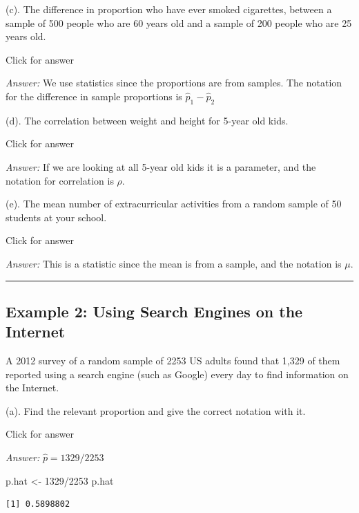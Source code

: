 \documentclass[
]{book}
\newenvironment{Shaded}{\begin{snugshade}}{\end{snugshade}}
\newcommand{\DecValTok}[1]{\textcolor[rgb]{0.00,0.00,0.81}{#1}}
\newcommand{\NormalTok}[1]{#1}
\newcommand{\OtherTok}[1]{\textcolor[rgb]{0.56,0.35,0.01}{#1}}
\newcommand{\SpecialCharTok}[1]{\textcolor[rgb]{0.00,0.00,0.00}{#1}}
\begin{document}
(c). The difference in proportion who have ever smoked cigarettes, between a sample of 500 people who are 60 years old and a sample of 200 people who are 25 years old.

Click for answer

\emph{Answer:} We use statistics since the proportions are from samples. The notation for the difference in sample proportions is \(\hat{p}_1 - \hat{p}_2\)

(d). The correlation between weight and height for 5-year old kids.

Click for answer

\emph{Answer:} If we are looking at all 5-year old kids it is a parameter, and the notation for correlation is \(\rho\).

(e). The mean number of extracurricular activities from a random sample of 50 students at your school.

Click for answer

\emph{Answer:} This is a statistic since the mean is from a sample, and the notation is \(\mu\).

\begin{center}\rule{0.5\linewidth}{0.5pt}\end{center}

\hypertarget{example-2-using-search-engines-on-the-internet}{%
\subsection{Example 2: Using Search Engines on the Internet}\label{example-2-using-search-engines-on-the-internet}}

A 2012 survey of a random sample of 2253 US adults found that 1,329 of them reported using a search engine (such as Google) every day to find information on the Internet.

(a). Find the relevant proportion and give the correct notation with it.

Click for answer

\emph{Answer:} \(\hat{p} = 1329/2253\)

\begin{Shaded}
\begin{Highlighting}[]
\NormalTok{p.hat }\OtherTok{\textless{}{-}} \DecValTok{1329}\SpecialCharTok{/}\DecValTok{2253}
\NormalTok{p.hat}
\end{Highlighting}
\end{Shaded}

\begin{verbatim}
[1] 0.5898802
\end{verbatim}
\end{document}
